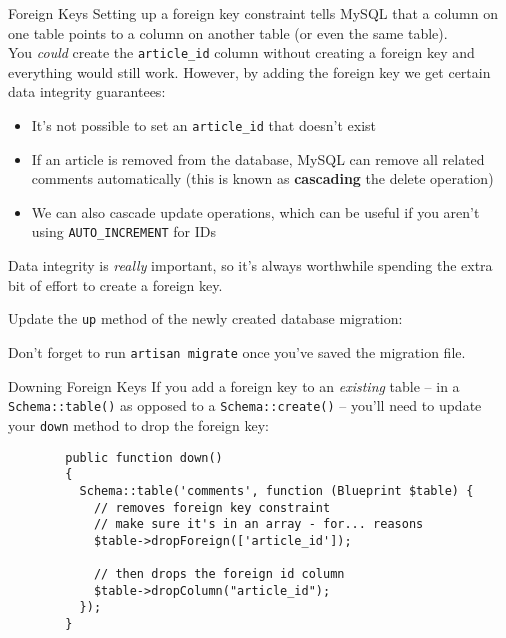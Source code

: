\begin{infobox}{Foreign Keys}
    Setting up a foreign key constraint tells MySQL that a column on one table points to a column on another table (or even the same table).
    \\

    You \textit{could} create the \texttt{article\_id} column without creating a foreign key and everything would still work. However, by adding the foreign key we get certain data integrity guarantees:

    \begin{itemize}
        \item It's not possible to set an \texttt{article\_id} that doesn't exist
        \item If an article is removed from the database, MySQL can remove all related comments automatically (this is known as \textbf{cascading} the delete operation)
        \item We can also cascade update operations, which can be useful if you aren't using \texttt{AUTO\_INCREMENT} for IDs
    \end{itemize}

    Data integrity is \textit{really} important, so it's always worthwhile spending the extra bit of effort to create a foreign key.
\end{infobox}

Update the \texttt{up} method of the newly created database migration:


Don't forget to run \texttt{artisan migrate} once you've saved the migration file.

\begin{infobox}{Downing Foreign Keys}
    If you add a foreign key to an \textit{existing} table – in a \texttt{Schema::table()} as opposed to a \texttt{Schema::create()} – you'll need to update your \texttt{down} method to drop the foreign key:

    \begin{verbatim}
        public function down()
        {
          Schema::table('comments', function (Blueprint $table) {
            // removes foreign key constraint
            // make sure it's in an array - for... reasons
            $table->dropForeign(['article_id']);

            // then drops the foreign id column
            $table->dropColumn("article_id");
          });
        }
    \end{verbatim}
\end{infobox}


